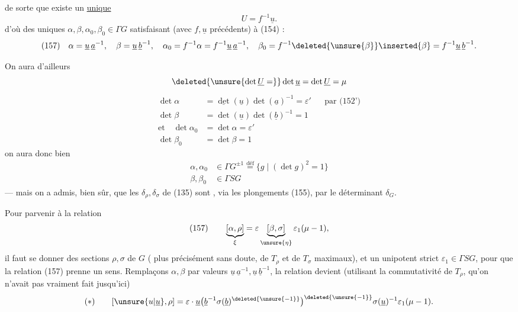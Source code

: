 de sorte que  existe un \uline{unique} 
\[
U=f^{-1}\underline u.
\]
d'où des uniques $\alpha,\beta,\alpha_0,\beta_0\in\Gamma G$ satisfaisant (avec $f,\underline u$ précédents) à (154) :
\[
(157)\quad
\alpha=\underline u\,\underline a^{-1},\quad
\beta=\underline u\,\underline b^{-1},\quad
\alpha_0=f^{-1}\alpha=f^{-1}\underline u\,\underline a^{-1},\quad
\beta_0=f^{-1}\deleted{\unsure{\beta}}\inserted{\beta}=f^{-1}\underline u\,\underline b^{-1}.
\]


On aura d'ailleurs
\[
\deleted{\unsure{\det\underline U=}}\det\underline u
=\det\underline U=\mu
\]
\[
\begin{aligned}
\det\alpha&=\underline{\det}(\underline u)\det(\underline a)^{-1}=\varepsilon'
&&\text{par (152')}\\
\det\beta&=\det(\underline u)\det(\underline b)^{-1}=1\\[3pt]
\text{et}\quad\det\alpha_0&=\det\alpha=\varepsilon'\\
\det\beta_0&=\det\beta=1
\end{aligned}
\]
on aura donc bien
\[
\begin{aligned}
\alpha,\alpha_0&\in\Gamma G^{\pm1}\overset{\text{déf}}=
\{g\mid(\det g)^2=1\}\\
\beta,\beta_0&\in\Gamma SG
\end{aligned}
\]
--- mais on a admis, bien sûr, que les  $\delta_\rho,\delta_\sigma$ de (135) sont , via les plongements (155), par le déterminant $\delta_G$.

Pour parvenir à la relation  
\[
(157)\qquad
\underbrace{[\alpha,\rho]}_{\xi}
=\varepsilon\underbrace{[\beta,\sigma]}_{\unsure{\eta}}\varepsilon_1(\mu-1),
\]
il faut se donner des sections $\rho,\sigma$ de $G$ ( plus précisément sans doute,  de $T_\rho$ et de $T_\sigma$ maximaux), et un unipotent strict $\varepsilon_1\in\Gamma SG$, pour que la relation (157) prenne un sens.
Remplaçons $\alpha,\beta$ par  valeurs $\underline u\,\underline a^{-1},\underline u\,\underline b^{-1}$, la relation devient (utilisant la commutativité de $T_\rho$,  qu'on n'avait pas vraiment fait  jusqu'ici)
\[
(*)\qquad
[\unsure{u|\underline u},\rho]
=\varepsilon\cdot\underline u
\bigl(\underline b^{-1}\sigma(\underline b)^{\deleted{\unsure{-1}}}\bigr)^{\deleted{\unsure{-1}}}
\sigma(\underline u)^{-1}\varepsilon_1(\mu-1).
\]

